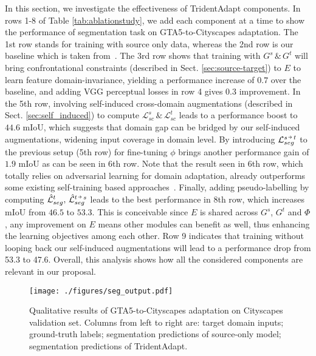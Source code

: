 \documentclass{bmvc2k}
\newcommand{\Sect}[1]{Sect. \ref{sec:#1}}
\newcommand{\Tab}[1]{Table \ref{tab:#1}}
\newcommand{\veryshortarrow}[1][3pt]{\mathrel{\hbox{\rule[\dimexpr\fontdimen22\textfont2-.2pt\relax]{#1}{.4pt}}\mkern-4mu\hbox{\usefont{U}{lasy}{m}{n}\symbol{41}}}}
\begin{document}
In this section, we investigate the effectiveness of TridentAdapt components. In rows 1-8 of \Tab{ablationstudy}, we add each component at a time to show the performance of segmentation task on GTA5-to-Cityscapes adaptation. The 1st row stands for training with source only data, whereas the 2nd row is our baseline which is taken from~\cite{tsai2018learning}. The 3rd row shows that training with $G^{s}\,\&\,G^{t}$ will bring confrontational constraints (described in \Sect{source-target}) to ${E}$ to learn feature domain-invariance, yielding a performance increase of $0.7$ over the baseline, and adding VGG perceptual losses in row 4 gives $0.3$ improvement. In the 5th row, involving self-induced cross-domain augmentations (described in \Sect{self_induced}) to compute ${\mathcal{L}^s_{sc}} \, \& \, {\mathcal{L}^t_{sc}}$ leads to a performance boost to $44.6$ mIoU, which suggests that domain gap can be bridged by our self-induced augmentations, widening input coverage in domain level. By introducing $\mathcal{L}^{s\,\veryshortarrow\,t}_{seg}$ to the previous setup (5th row) for fine-tuning $\phi$ brings another performance gain of $1.9$ mIoU as can be seen in 6th row. Note that the result seen in 6th row, which totally relies on adversarial learning for domain adaptation, already outperforms some existing self-training based approaches~\cite{choi2019self, du2019ssf, pan2020unsupervised, zou2018unsupervised}. Finally, adding pseudo-labelling by computing $\Hat{\mathcal{L}}^{t}_{seg}, \, \Hat{\mathcal{L}}^{t\,\veryshortarrow\,s}_{seg}$ leads to the best performance in 8th row, which increases mIoU from $46.5$ to $53.3$. This is conceivable since ${E}$ is shared across $G^{s}$, $G^{t}$ and ${\Phi}$, any improvement on ${E}$ means other modules can benefit as well, thus enhancing the learning objectives among each other. Row 9 indicates that training without looping back our self-induced augmentations will lead to a performance drop from 53.3 to 47.6. Overall, this analysis shows how all the considered components are relevant in our proposal. 


\begin{figure}[htb!]
\centering
\texttt{[image: ./figures/seg\_output.pdf]}
\caption{ Qualitative results of GTA5-to-Cityscapes adaptation on Cityscapes validation set. Columns from left to right are: target domain inputs; ground-truth labels; segmentation predictions of source-only model;  segmentation predictions of TridentAdapt.}
\label{fig:seg_output}
\vspace{-3.5mm}
\end{figure}
\end{document}
